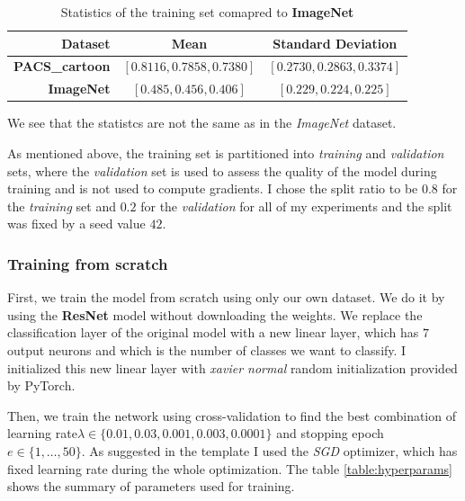 \documentclass[a4paper,11pt]{article}
\begin{document}
\begin{table}[ht]
    \centering
    \begin{tabular}{| r | c | c |}
        \hline
        Dataset                & Mean                       & Standard Deviation         \\
        \hline
        \hline
        \textbf{PACS\_cartoon} & $[0.8116, 0.7858, 0.7380]$ & $[0.2730, 0.2863, 0.3374]$ \\
        \hline
        \textbf{ImageNet}      & $[0.485, 0.456, 0.406]$    & $[0.229, 0.224, 0.225]$    \\
        \hline
    \end{tabular}
    \caption{Statistics of the training set comapred to \textbf{ImageNet}}
    \label{table:stats}
\end{table}

We see that the statistcs are not the same as in the \textit{ImageNet} dataset.

As mentioned above, the training set is partitioned into \textit{training} and \textit{validation} sets, where the \textit{validation} set is used to assess the quality of the model during training and is not used to compute gradients.
I chose the split ratio to be $0.8$ for the \textit{training} set and $0.2$ for the \textit{validation} for all of my experiments and the split was fixed by a seed value $42$.

\subsubsection{Training from scratch}
First, we train the model from scratch using only our own dataset.
We do it by using the \textbf{ResNet} model without downloading the weights.
We replace the classification layer of the original model with a new linear layer, which has $7$ output neurons and which is the number of classes we want to classify.
I initialized this new linear layer with \textit{xavier normal} random initialization provided by PyTorch.

Then, we train the network using cross-validation to find the best combination of learning rate\newline $\lambda \in \{0.01, 0.03, 0.001, 0.003, 0.0001\}$ and stopping epoch $e \in \{1, \dots, 50\}$.
As suggested in the template I used the \textit{SGD} optimizer, which has fixed learning rate during the whole optimization.
The table \ref{table:hyperparams} shows the summary of parameters used for training.
\end{document}
